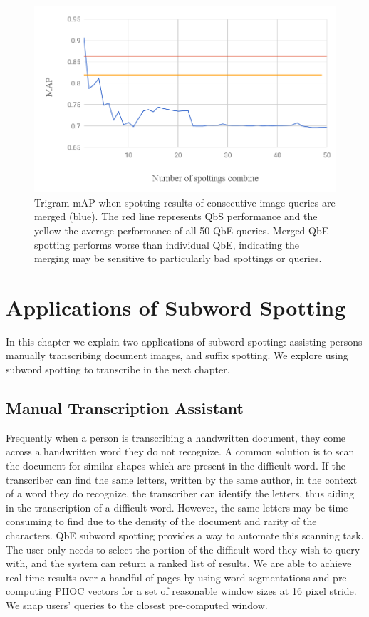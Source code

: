 \documentclass[ms,electronic,twosidetoc,letterpaper,chaptercenter,parttop,lof,lot]{byumsphd}
\begin{document}
\begin{figure}
    \centering
    \includegraphics[width=.75\textwidth]{trigram_respot_chart}
    \caption{Trigram mAP when spotting results of consecutive image queries are merged (blue). The red line represents QbS performance and the yellow the average performance of all 50 QbE queries. Merged QbE spotting performs worse than individual QbE, indicating the merging may be sensitive to particularly bad spottings or queries.}
    \label{fig:trigram_respot}
\end{figure}






\chapter{Applications of Subword Spotting}\label{applications}

In this chapter we explain two applications of subword spotting: assisting persons manually transcribing document images, and suffix spotting. We explore using subword spotting to transcribe in the next chapter.

\section{Manual Transcription Assistant}
Frequently when a person is transcribing a handwritten document, they come across a handwritten word they do not recognize. A common solution is to scan the document for similar shapes which are present in the difficult word. If the transcriber can find the same letters, written by the same author, in the context of a word they do recognize, the transcriber can identify the letters, thus aiding in the transcription of a difficult word. 
However, the same letters may be time consuming to find due to the density of the document and rarity of the characters. QbE subword spotting provides a way to automate this scanning task. The user only needs to select the portion of the difficult word they wish to query with, and the system can return a ranked list of results.
We are able to achieve real-time results over a handful of pages by using word segmentations and pre-computing PHOC vectors for a set of reasonable window sizes at 16  pixel stride. We snap users' queries to the closest pre-computed window. 
\end{document}
